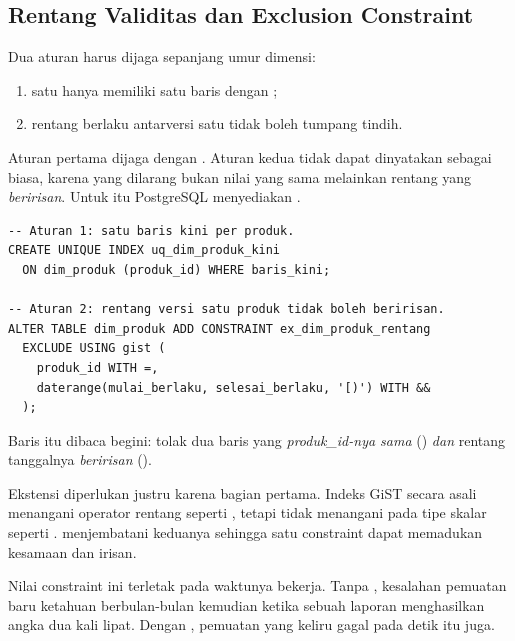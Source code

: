 \subsection{Rentang Validitas dan Exclusion Constraint}

Dua aturan harus dijaga sepanjang umur dimensi:

\begin{enumerate}[leftmargin=1.4em]
  \item satu  hanya memiliki satu baris dengan
        ;
  \item rentang berlaku antarversi satu  tidak boleh
        tumpang tindih.
\end{enumerate}

Aturan pertama dijaga dengan . Aturan kedua tidak
dapat dinyatakan sebagai  biasa, karena yang dilarang bukan
nilai yang sama melainkan rentang yang \emph{beririsan}. Untuk itu PostgreSQL
menyediakan .

\begin{lstlisting}[style=sqlgaya]
-- Aturan 1: satu baris kini per produk.
CREATE UNIQUE INDEX uq_dim_produk_kini
  ON dim_produk (produk_id) WHERE baris_kini;

-- Aturan 2: rentang versi satu produk tidak boleh beririsan.
ALTER TABLE dim_produk ADD CONSTRAINT ex_dim_produk_rentang
  EXCLUDE USING gist (
    produk_id WITH =,
    daterange(mulai_berlaku, selesai_berlaku, '[)') WITH &&
  );
\end{lstlisting}

Baris itu dibaca begini: tolak dua baris yang \emph{produk\_id-nya sama}
() \emph{dan} rentang tanggalnya \emph{beririsan}
().

\begin{catatan}
Ekstensi  diperlukan justru karena bagian pertama.
Indeks GiST secara asali menangani operator rentang seperti \perintah{\&\&},
tetapi tidak menangani \perintah{=} pada tipe skalar seperti .
 menjembatani keduanya sehingga satu constraint dapat
memadukan kesamaan dan irisan.
\end{catatan}

Nilai constraint ini terletak pada waktunya bekerja. Tanpa ,
kesalahan pemuatan baru ketahuan berbulan-bulan kemudian ketika sebuah laporan
menghasilkan angka dua kali lipat. Dengan , pemuatan yang
keliru gagal pada detik itu juga.

